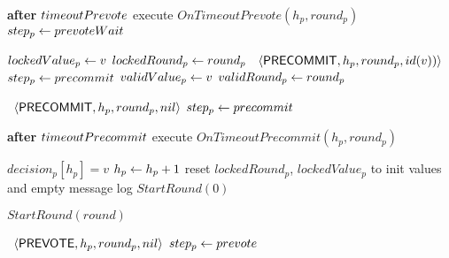 \begin{algorithm}[htb!]
\begin{algorithmic}[1]
		\SPACE 
		\label{line:tab:recvAny2/3Prevote} 
		\STATE \textbf{after} $timeoutPrevote$ execute $OnTimeoutPrevote(h_p, round_p)$ \label{line:tab:timeoutPrevote} 
		\STATE $step_p \leftarrow prevoteWait$ \label{line:tab:setStateToPrevoteWait} 
		\ENDUPON
		
		\SPACE 
		\label{line:tab:recvPrevote} 
			\STATE $lockedValue_p \leftarrow v$                \label{line:tab:setLockedValue} 
			\STATE $lockedRound_p \leftarrow round_p$   \label{line:tab:setLockedRound} 
			\STATE \Broadcast \ $\langle\mathsf{PRECOMMIT},h_p,round_p,id(v))\rangle$  
			\label{line:tab:precommit-v}	
			\STATE $step_p \leftarrow precommit$ \label{line:tab:setStateToCommit} 
		\ENDIF 
		\STATE $validValue_p \leftarrow v$ \label{line:tab:setValidRound} 
		\STATE $validRound_p \leftarrow round_p$ \label{line:tab:setValidValue} 
		\ENDUPON
		
		\SHORTSPACE 
			\STATE \Broadcast \ $\langle\mathsf{PRECOMMIT},h_p,round_p, nil\rangle$
			\label{line:tab:precommit-v-1} 
			\STATE $step_p \leftarrow precommit$ 
		\ENDUPON
		
		\SPACE 
		\label{line:tab:startTimeoutPrecommit} 
			\STATE \textbf{after} $timeoutPrecommit$ execute 
			$OnTimeoutPrecommit(h_p, round_p)$ 
		\ENDUPON 
		
		\SPACE 
		\label{line:tab:onDecideRule} 
			 \label{line:tab:validDecisionValue} 
				\STATE $decision_p[h_p] = v$ \label{line:tab:decide} 
				\STATE$h_p \leftarrow h_p + 1$ \label{line:tab:increaseHeight} 
				\STATE reset $lockedRound_p$, $lockedValue_p$ to init values 
				and empty message log 
				\STATE $StartRound(0)$   	
			\ENDIF 
		\ENDUPON
		
		\SHORTSPACE 
		\label{line:tab:skipRounds} 
			\STATE $StartRound(round)$ \label{line:tab:nextRound2} 
		\ENDUPON
		
		\SHORTSPACE 
		 \label{line:tab:onTimeoutPropose} 
			\STATE \Broadcast \ $\langle\mathsf{PREVOTE},h_p,round_p, nil\rangle$ 
		 	\label{line:tab:prevote-nil-on-timeout}	
		 	\STATE $step_p \leftarrow prevote$ 
		 \ENDIF	
		 \ENDFUNCTION
		

\end{algorithmic}
\end{algorithm}
